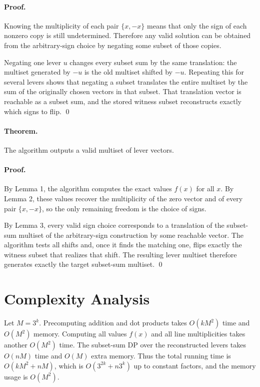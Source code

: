 \documentclass[11pt]{article}
\begin{document}
\paragraph{Proof.}
Knowing the multiplicity of each pair $\{x,-x\}$ means that only the sign of each nonzero copy is
still undetermined. Therefore any valid solution can be obtained from the arbitrary-sign choice by
negating some subset of those copies.

Negating one lever $u$ changes every subset sum by the same translation: the multiset generated by
$-u$ is the old multiset shifted by $-u$. Repeating this for several levers shows that negating a
subset translates the entire multiset by the sum of the originally chosen vectors in that subset.
That translation vector is reachable as a subset sum, and the stored witness subset reconstructs
exactly which signs to flip. \qed

\paragraph{Theorem.}
The algorithm outputs a valid multiset of lever vectors.

\paragraph{Proof.}
By Lemma 1, the algorithm computes the exact values $f(x)$ for all $x$. By Lemma 2, these values
recover the multiplicity of the zero vector and of every pair $\{x,-x\}$, so the only remaining
freedom is the choice of signs.

By Lemma 3, every valid sign choice corresponds to a translation of the subset-sum multiset of the
arbitrary-sign construction by some reachable vector. The algorithm tests all shifts and, once it finds
the matching one, flips exactly the witness subset that realizes that shift. The resulting lever multiset
therefore generates exactly the target subset-sum multiset. \qed

\section*{Complexity Analysis}

Let $M = 3^k$. Precomputing addition and dot products takes $O(kM^2)$ time and $O(M^2)$ memory.
Computing all values $f(x)$ and all line multiplicities takes another $O(M^2)$ time. The subset-sum
DP over the reconstructed levers takes $O(nM)$ time and $O(M)$ extra memory. Thus the total
running time is $O(kM^2 + nM)$, which is $O(3^{2k} + n3^k)$ up to constant factors, and the memory
usage is $O(M^2)$.
\end{document}

